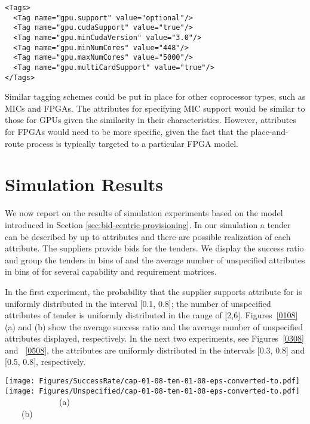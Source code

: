\documentclass[10pt, conference, compsocconf]{IEEEtran}
\begin{document}
\begin{lstlisting}[caption=Proposed TOSCA node type tags for GPU acceleration, label=lst:name-value-example]
<Tags>
  <Tag name="gpu.support" value="optional"/>
  <Tag name="gpu.cudaSupport" value="true"/>
  <Tag name="gpu.minCudaVersion" value="3.0"/>
  <Tag name="gpu.minNumCores" value="448"/>
  <Tag name="gpu.maxNumCores" value="5000"/>
  <Tag name="gpu.multiCardSupport" value="true"/>
</Tags>
\end{lstlisting}

Similar tagging schemes could be put in place for other coprocessor types, such as MICs and FPGAs. The attributes for specifying MIC support would be similar to those for GPUs given the similarity in their characteristics. However, attributes for FPGAs would need to be more specific, given the fact that the place-and-route process is typically targeted to a particular FPGA model.


\section{Simulation Results}
\label{sec:simulation_results}


We now report on the results of simulation experiments based on the model introduced in Section \ref{sec:bid-centric-provisioning}. In our simulation a tender can be described by up to  attributes and there are  possible realization of each attribute. The  suppliers provide  bids for the  tenders. We display the success ratio and group the tenders in bins of  and the average number of unspecified attributes in bins of  for several capability and requirement matrices.

In the first experiment, the probability that the supplier  supports attribute  for  is uniformly distributed in the interval [0.1, 0.8]; the number of unspecified attributes of tender  is uniformly distributed in the range of [2,6]. Figures~\ref{0108}(a) and (b) show the average success ratio and the average number of unspecified attributes displayed, respectively. In the next two experiments, see Figures~\ref{0308} and ~\ref{0508}, the attributes are uniformly distributed in the intervals [0.3, 0.8] and [0.5, 0.8], respectively.

\begin{figure*}[p]
\begin{center}
\texttt{[image: Figures/SuccessRate/cap-01-08-ten-01-08-eps-converted-to.pdf]}
\texttt{[image: Figures/Unspecified/cap-01-08-ten-01-08-eps-converted-to.pdf]}\\
~~~~~~~~~~~~~(a)~~~~~~~~~~~~~~~~~~~~~~~~~~~~~~~~~~~~~~~~~~~~~~~~~~~~~~~~~~~~(b)
\end{center}
\caption{ uniformly distributed in [0.1 0.8]. (a) Average success ratio of tenders. (b) Average number of unspecified attributes for tenders.}
\label{0108}
\end{figure*}
\end{document}
